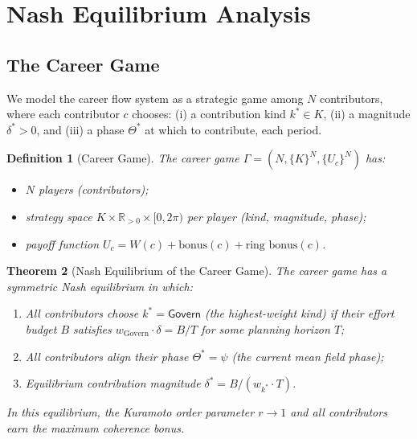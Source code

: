 \documentclass[12pt]{article}
\newtheorem{theorem}{Theorem}
\newtheorem{definition}[theorem]{Definition}
\newcommand{\contrib}[1]{\mathsf{#1}}
\begin{document}
\section{Nash Equilibrium Analysis}
\label{sec:nash}

\subsection{The Career Game}

We model the career flow system as a strategic game among $N$ contributors,
where each contributor $c$ chooses: (i) a contribution kind $k^* \in K$,
(ii) a magnitude $\delta^* > 0$, and (iii) a phase $\Theta^*$ at which to
contribute, each period.

\begin{definition}[Career Game]
  The \emph{career game} $\Gamma = (N, \{K\}^N, \{U_c\}^N)$ has:
  \begin{itemize}[leftmargin=*]
    \item $N$ players (contributors);
    \item strategy space $K \times \mathbb{R}_{>0} \times [0, 2\pi)$ per player
      (kind, magnitude, phase);
    \item payoff function $U_c = W(c) + \text{bonus}(c) + \text{ring bonus}(c)$.
  \end{itemize}
\end{definition}

\begin{theorem}[Nash Equilibrium of the Career Game]
  \label{thm:nash}
  The career game has a symmetric Nash equilibrium in which:
  \begin{enumerate}[label=(\roman*)]
    \item All contributors choose $k^* = \contrib{Govern}$ (the highest-weight
      kind) if their effort budget $B$ satisfies
      $w_\text{Govern} \cdot \delta = B / T$ for some planning horizon $T$;
    \item All contributors align their phase $\Theta^* = \psi$ (the current mean
      field phase);
    \item Equilibrium contribution magnitude $\delta^* = B / (w_{k^*} \cdot T)$.
  \end{enumerate}
  In this equilibrium, the Kuramoto order parameter $r \to 1$ and all
  contributors earn the maximum coherence bonus.
\end{theorem}
\end{document}
